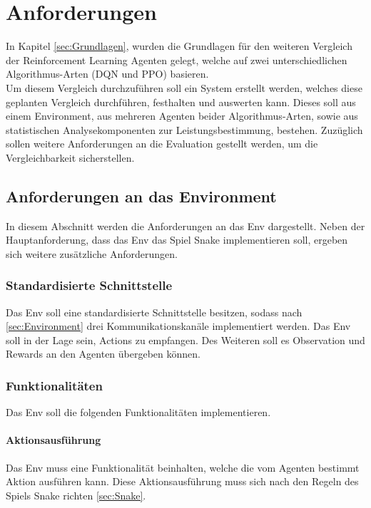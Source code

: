 \chapter{Anforderungen} \label{chap:Anforderungen}
In Kapitel \ref{sec:Grundlagen}, wurden die Grundlagen für den weiteren Vergleich der Reinforcement Learning Agenten gelegt, welche auf zwei unterschiedlichen Algorithmus-Arten (DQN und PPO) basieren.\\
Um diesem Vergleich durchzuführen soll ein System erstellt werden, welches diese geplanten Vergleich durchführen, festhalten und auswerten kann. Dieses soll aus einem Environment, aus mehreren Agenten beider Algorithmus-Arten, sowie aus statistischen Analysekomponenten zur Leistungsbestimmung, bestehen. Zuzüglich sollen weitere Anforderungen an die Evaluation gestellt werden, um die Vergleichbarkeit sicherstellen.

\section{Anforderungen an das Environment} \label{sec:Anforderungen_Env}
In diesem Abschnitt werden die Anforderungen an das Env dargestellt. Neben der Hauptanforderung, dass das Env das Spiel Snake implementieren soll, ergeben sich weitere zusätzliche Anforderungen.

\subsection{Standardisierte Schnittstelle} \label{sec:Anforderungen_Schnittstelle}
Das Env soll eine standardisierte Schnittstelle besitzen, sodass nach \ref{sec:Environment} drei Kommunikationskanäle implementiert werden. Das Env soll in der Lage sein, Actions zu empfangen. Des Weiteren soll es Observation und Rewards an den Agenten übergeben können.

\subsection{Funktionalitäten} \label{sec:Anforderungen_funktionalität_Env}
Das Env soll die folgenden Funktionalitäten implementieren.

\subsubsection{Aktionsausführung}
Das Env muss eine Funktionalität beinhalten, welche die vom Agenten bestimmt Aktion ausführen kann. Diese Aktionsausführung muss sich nach den Regeln des Spiels Snake richten \ref{sec:Snake}.


